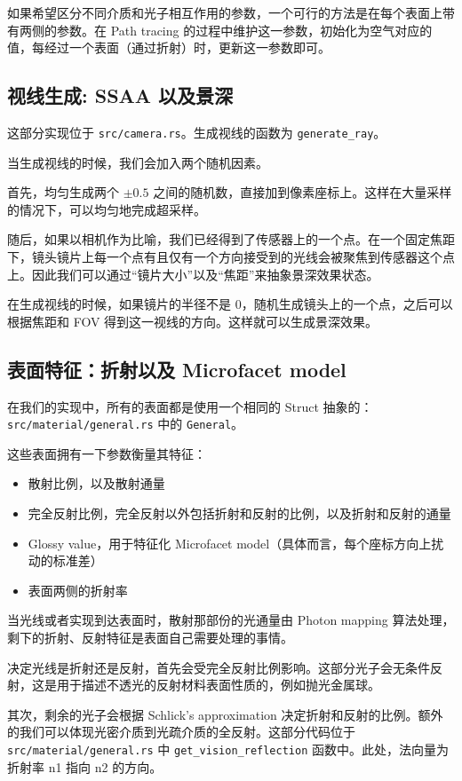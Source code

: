 \documentclass{ctexart}
\begin{document}
如果希望区分不同介质和光子相互作用的参数，一个可行的方法是在每个表面上带有两侧的参数。在 Path tracing 的过程中维护这一参数，初始化为空气对应的值，每经过一个表面（通过折射）时，更新这一参数即可。

\subsection{视线生成: SSAA 以及景深}
\label{sec:ray-generation}

这部分实现位于 \texttt{src/camera.rs}。生成视线的函数为 \texttt{generate\_ray}。

当生成视线的时候，我们会加入两个随机因素。

首先，均匀生成两个 $\pm 0.5$ 之间的随机数，直接加到像素座标上。这样在大量采样的情况下，可以均匀地完成超采样。

随后，如果以相机作为比喻，我们已经得到了传感器上的一个点。在一个固定焦距下，镜头镜片上每一个点有且仅有一个方向接受到的光线会被聚焦到传感器这个点上。因此我们可以通过“镜片大小”以及“焦距”来抽象景深效果状态。

在生成视线的时候，如果镜片的半径不是 0，随机生成镜头上的一个点，之后可以根据焦距和 FOV 得到这一视线的方向。这样就可以生成景深效果。

\subsection{表面特征：折射以及 Microfacet model}
在我们的实现中，所有的表面都是使用一个相同的 Struct 抽象的：\texttt{src/material/general.rs} 中的 \texttt{General}。

这些表面拥有一下参数衡量其特征：
\begin{itemize}
  \item 散射比例，以及散射通量
  \item 完全反射比例，完全反射以外包括折射和反射的比例，以及折射和反射的通量
  \item Glossy value，用于特征化 Microfacet model（具体而言，每个座标方向上扰动的标准差）
  \item 表面两侧的折射率
\end{itemize}

当光线或者实现到达表面时，散射那部份的光通量由 Photon mapping 算法处理，剩下的折射、反射特征是表面自己需要处理的事情。

决定光线是折射还是反射，首先会受完全反射比例影响。这部分光子会无条件反射，这是用于描述不透光的反射材料表面性质的，例如抛光金属球。

其次，剩余的光子会根据 Schlick's approximation \cite{schlick1994inexpensive} 决定折射和反射的比例。额外的我们可以体现光密介质到光疏介质的全反射。这部分代码位于 \texttt{src/material/general.rs} 中 \texttt{get\_vision\_reflection} 函数中。此处，法向量为折射率 n1 指向 n2 的方向。
\end{document}

